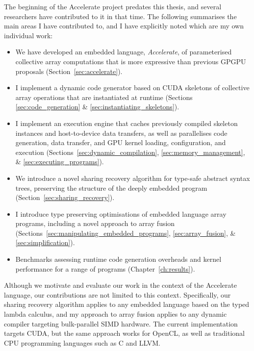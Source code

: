 The beginning of the Accelerate project predates this thesis, and several
researchers have contributed to it in that time. The following summarises the
main areas I have contributed to, and I have explicitly noted which are my own
individual work:
%
\begin{itemize}
    \item We have developed an embedded language, \emph{Accelerate}, of
        parameterised collective array computations that is more expressive than
        previous GPGPU\gpgpu{} proposals (Section~\ref{sec:accelerate}).

    \item I implement a dynamic code generator based on CUDA\cuda{}
        skeletons\skeleton{} of collective array operations that are
        instantiated at runtime (Sections \ref{sec:code_generation} \&
        \ref{sec:instantiating_skeletons}).

    \item I implement an execution engine that caches previously compiled
        skeleton instances and host-to-device data transfers, as well as
        parallelises code generation, data transfer, and GPU\gpu{} kernel
        loading, configuration, and execution
        (Sections~\ref{sec:dynamic_compilation},
        \ref{sec:memory_management}, \&
        \ref{sec:executing_programs}).

    \item We introduce a novel sharing recovery algorithm for type-safe abstract
        syntax trees, preserving the structure of the deeply embedded program
        (Section~\ref{sec:sharing_recovery}).

    \item I introduce type preserving optimisations of embedded language array
        programs, including a novel approach to array fusion
        (Sections~\ref{sec:manipulating_embedded_programs},
        \ref{sec:array_fusion}, \&
        \ref{sec:simplification}).

    \item Benchmarks assessing runtime code generation overheads and kernel
        performance for a range of programs (Chapter~\ref{ch:results}).
\end{itemize}

Although we motivate and evaluate our work in the context of the Accelerate
language, our contributions are not limited to this context. Specifically, our
sharing recovery algorithm applies to any embedded language based on the typed
lambda calculus, and my approach to array fusion applies to any dynamic compiler
targeting bulk-parallel SIMD hardware. The current implementation targets
CUDA\cuda{}, but the same approach works for OpenCL, as well as traditional CPU
programming languages such as C and LLVM.

